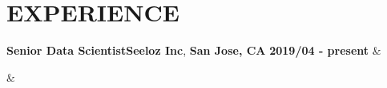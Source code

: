 \documentclass[12pt,a4paper,roman]{moderncv}
\makeatletter
\newcommand*{\customcventry}[7][.25em]{
  {\bfseries #3}\hfill{\bfseries #4}, {\bfseries #5} \hfill {\bfseries #2}
  \ifx&#7&%
  \else{\\%
    \begin{minipage}{\maincolumnwidth}%
      \small#7%
    \end{minipage}}\fi%
  \par\addvspace{#1}}
\makeatother
\begin{document}
\section{EXPERIENCE}

{\customcventry{2019/04 - present}{Senior Data Scientist}{Seeloz Inc}{San Jose, CA}{}
{\begin{itemize}

\end{itemize}}}
\end{document}
